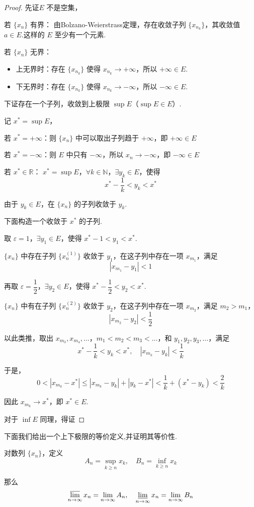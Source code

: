 \begin{proof}
	先证$E$ 不是空集，
	
	若 $\{x_n\}$ 有界：
	由Bolzano-Weierstrass定理，存在收敛子列 $\{x_{n_k}\}$，其收敛值 $a \in E$.这样的 $E$ 至少有一个元素.
	
	若 $\{x_n\}$ 无界：
	\begin{itemize}
		\item 上无界时：存在 $\{x_{n_k}\}$ 使得 $x_{n_k} \to +\infty$，所以 $ +\infty\in E$.
		\item 下无界时：存在 $\{x_{n_k}\}$ 使得 $x_{n_k} \to -\infty$，所以 $ -\infty\in E$.
	\end{itemize}
	
	下证存在一个子列，收敛到上极限 $\sup E$（$\sup E \in E$）.
	
	记 $x^* = \sup E$，
	
	若 $x^* = +\infty$：则 $\{x_n\}$ 中可以取出子列趋于 $+\infty$，即 $+\infty \in E$
	
	若 $x^* = -\infty$：则 $E$ 中只有 $-\infty$，所以 $x_n \to -\infty$，即 $-\infty \in E$
	
	若 $x^* \in \mathbb{R}$：
	$x^* = \sup E$，$\forall k \in \mathbb{N}$，$\exists y_k \in E$，使得
	\[
	x^* - \frac{1}{k} < y_k < x^*
	\]
	
	由于 $y_k \in E$，在 $\{x_n\}$ 的子列收敛于 $y_k$.
	
	下面构造一个收敛于 $x^*$ 的子列.
	
	取 $\varepsilon = 1$，$\exists y_1 \in E$，使得 $x^* - 1 < y_1 < x^*$.
	
	$\{x_n\}$ 中存在子列 $\{x_n^{(1)}\}$ 收敛于 $y_1$，在这子列中存在一项 $x_{m_1}$，满足
	\[
	|x_{m_1} - y_1| < 1
	\]
	
	再取 $\varepsilon = \dfrac{1}{2}$，$\exists y_2 \in E$，使得 $x^* - \dfrac{1}{2} < y_2 < x^*$.
	
	$\{x_n\}$ 中有在子列 $\{x_n^{(2)}\}$ 收敛于 $y_2$，在这子列中存在一项 $x_{m_2}$，满足 $m_2 > m_1$，
	\[
	|x_{m_2} - y_2| < \frac{1}{2}
	\]
	
	以此类推，取出 $x_{m_3}, x_{m_4}, \ldots$，$m_1 < m_2 < m_3 < \ldots$，和 $y_1, y_2, y_3, \ldots$，满足
	\[
	x^* - \frac{1}{k} < y_k < x^*, \quad |x_{m_k} - y_k| < \frac{1}{k}
	\]
	
	于是，
	\[
	0 < |x_{m_k} - x^*| \leqslant |x_{m_k} - y_k| + |y_k - x^*| < \frac{1}{k} + \left(x^* - y_k\right) < \frac{2}{k}
	\]
	
	因此 $x_{m_k} \to x^*$，即 $x^* \in E$.
	
	对于 $\inf E$ 同理，得证
	
\end{proof}
下面我们给出一个上下极限的等价定义,并证明其等价性.
\begin{proposition}
	对数列 $\{x_n\}$，定义
	\[
	A_n = \sup_{k \geqslant n} x_k, \quad B_n = \inf_{k \geqslant n} x_k
	\]
	
	那么
	\[
	\varlimsup_{n \to \infty} x_n = \lim_{n \to \infty} A_n, \quad \varliminf_{n \to \infty} x_n = \lim_{n \to \infty} B_n
	\]
\end{proposition}


